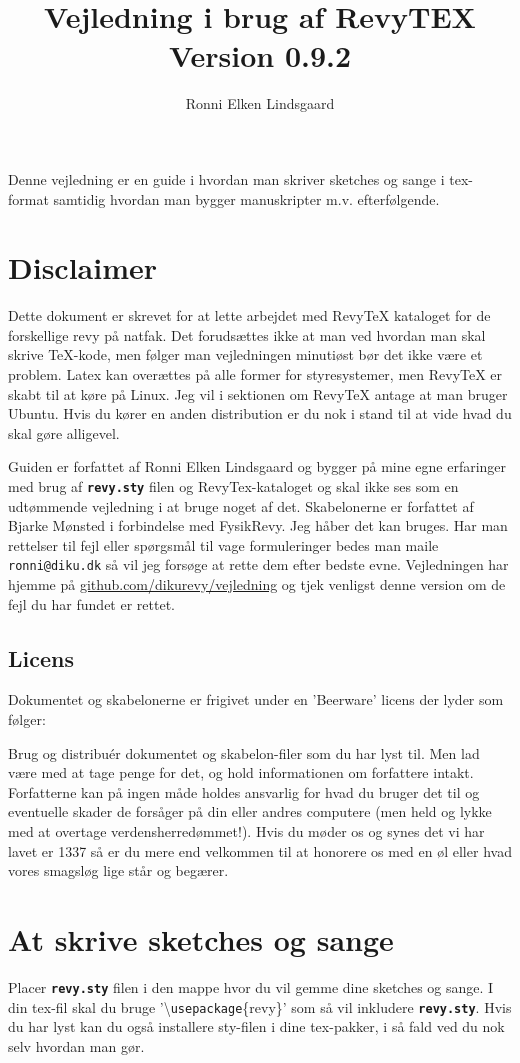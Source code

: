\documentclass{article}
\title{Vejledning i brug af RevyTEX\\Version 0.9.2}
\author{Ronni Elken Lindsgaard}
\newcommand{\fname}[1]{\textbf{\texttt{#1}}}
\newcommand{\cmd}[1]{\textbackslash \texttt{#1}}
\begin{document}
\maketitle
Denne vejledning er en guide i hvordan man skriver sketches og sange i
tex-format samtidig hvordan man bygger manuskripter m.v. efterfølgende.
\section{Disclaimer}
Dette dokument er skrevet for at lette arbejdet med RevyTeX kataloget
for de forskellige revy på natfak. Det forudsættes ikke at man ved
hvordan man skal skrive TeX-kode, men følger man vejledningen
minutiøst bør det ikke være et problem. Latex kan overættes på alle
former for styresystemer, men RevyTeX er skabt til at køre på Linux.
Jeg vil i sektionen om RevyTeX antage at man bruger Ubuntu. Hvis du
kører en anden distribution er du nok i stand til at vide hvad du skal
gøre alligevel.

Guiden er forfattet af Ronni Elken Lindsgaard og bygger på mine egne
erfaringer med brug af \fname{revy.sty} filen og RevyTex-kataloget og
skal ikke ses som en udtømmende vejledning i at bruge noget af det.
Skabelonerne er forfattet af Bjarke Mønsted i forbindelse med FysikRevy.
Jeg håber det kan bruges. Har man rettelser til fejl eller spørgsmål til
vage formuleringer bedes man maile
\texttt{ronni@diku.dk} så vil jeg forsøge at rette dem efter bedste
evne. Vejledningen har hjemme på \url{github.com/dikurevy/vejledning} og
tjek venligst denne version om de fejl du har fundet er rettet.

\subsection{Licens}
Dokumentet og skabelonerne er frigivet under en 'Beerware' licens der
lyder som følger:

Brug og distribuér dokumentet og skabelon-filer som du har lyst til. Men
lad være med at tage penge for det, og hold informationen om forfattere
intakt. Forfatterne kan
på ingen måde holdes ansvarlig for hvad du bruger det til og eventuelle
skader de forsåger på din eller andres computere (men held og lykke med
at overtage verdensherredømmet!). Hvis du
møder os og synes det vi har lavet er 1337 så er du mere end velkommen
til at honorere os med en øl eller hvad vores smagsløg lige står og
begærer.

\section{At skrive sketches og sange}
Placer \fname{revy.sty} filen i den mappe hvor du vil gemme dine
sketches og sange. I din tex-fil skal du bruge '\cmd{usepackage}\{revy\}' som
så vil inkludere \fname{revy.sty}. Hvis du har lyst kan du også installere
sty-filen i dine tex-pakker, i så fald ved du nok selv hvordan man gør.
\end{document}
